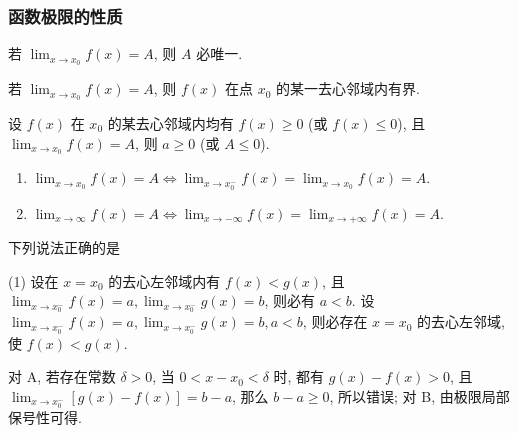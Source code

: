 \subsubsection{函数极限的性质}

\begin{theorem}[函数极限的唯一性]
    若 $\displaystyle\lim_{x\to x_0}f(x)=A$, 则 $A$ 必唯一.
\end{theorem}

\begin{theorem}[函数极限的有界性]
    若 $\displaystyle\lim_{x\to x_0}f(x)=A$, 则 $f(x)$ 在点 $x_0$ 的某一去心邻域内有界.
\end{theorem}

\begin{theorem}[函数极限的保号性]
    设 $f(x)$ 在 $x_0$ 的某去心邻域内均有 $f(x)\geqslant 0$ (或 $f(x)\leqslant 0$), 且 $\displaystyle\lim_{x\to x_0}f(x)=A$, 则 $a\geqslant 0$ (或 $A\leqslant 0$).
\end{theorem}

\begin{theorem}[函数极限的充要条件]
    \begin{enumerate}[label=(\arabic{*})]
        \item $\displaystyle\lim _{x \to x_{0}} f(x)=A \Leftrightarrow \lim _{x \to x_{0}^{-}} f(x)=\lim _{x \to x_{0}} f(x)=A $.
        \item $\displaystyle\lim _{x \to \infty} f(x)=A \Leftrightarrow \lim _{x \to-\infty} f(x)=\lim _{x \to+\infty} f(x)=A .$
    \end{enumerate}
\end{theorem}

\begin{example}
    下列说法正确的是 
    \begin{tasks}(1)
        \task 设在 $x=x_0$ 的去心左邻域内有 $f(x)<g(x)$, 且 $\displaystyle \lim_{x \to x_0^-}f(x)=a, \lim_{x \to x_0^-}g(x)=b$, 则必有 $a<b$.
        \task 设 $\displaystyle \lim_{x \to x_0^-}f(x)=a, \lim_{x \to x_0^-}g(x)=b,a<b$, 则必存在 $x=x_0$ 的去心左邻域, 使 $f(x)<g(x)$.
    \end{tasks}
\end{example}
\begin{solution}
    对 A, 若存在常数 $\delta>0$, 当 $0<x-x_0<\delta$ 时, 都有 $g(x)-f(x)>0$, 且 $\displaystyle \lim_{x \to x_0^-}[g(x)-f(x)]=b-a$, 那么 $b-a\geqslant 0$, 所以错误;
    对 B, 由极限局部保号性可得.
\end{solution}

